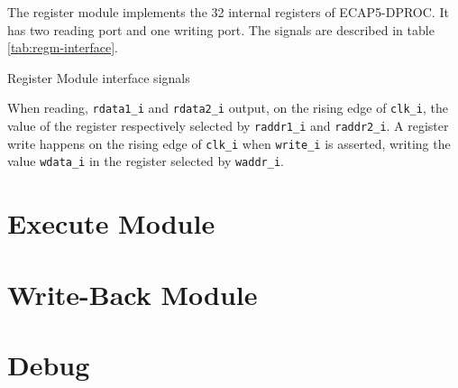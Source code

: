 \begin{content}
The register module implements the 32 internal registers of ECAP5-DPROC. It has two reading port and one writing port. The signals are described in table \ref{tab:regm-interface}. 
\end{content}

\begin{table}[H]
  \centering
  
  \caption{Register Module interface signals}
  \label{tab:regm-interface}
\end{table}

\begin{content}
  When reading, \texttt{rdata1\_i} and \texttt{rdata2\_i} output, on the rising edge of \texttt{clk\_i}, the value of the register respectively selected by \texttt{raddr1\_i} and \texttt{raddr2\_i}. A register write happens on the rising edge of \texttt{clk\_i} when \texttt{write\_i} is asserted, writing the value \texttt{wdata\_i} in the register selected by \texttt{waddr\_i}.
\end{content}

\newpage

\section{Execute Module}
\newpage

\section{Write-Back Module}
\newpage

\section{Debug}
\newpage
